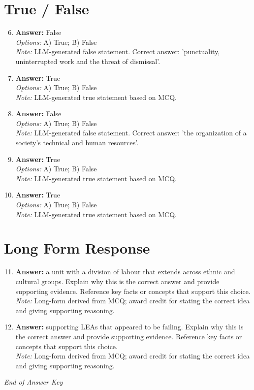 \documentclass[12pt]{article}
\begin{document}
\section*{True / False}
\begin{enumerate}[label=\arabic*.]
\setcounter{enumi}{5}
\item \textbf{Answer:} False
\\ \textit{Options:} A) True; B) False
\\ \textit{Note:} LLM-generated false statement. Correct answer: 'punctuality, uninterrupted work and the threat of dismissal'.
\item \textbf{Answer:} True
\\ \textit{Options:} A) True; B) False
\\ \textit{Note:} LLM-generated true statement based on MCQ.
\item \textbf{Answer:} False
\\ \textit{Options:} A) True; B) False
\\ \textit{Note:} LLM-generated false statement. Correct answer: 'the organization of a society's technical and human resources'.
\item \textbf{Answer:} True
\\ \textit{Options:} A) True; B) False
\\ \textit{Note:} LLM-generated true statement based on MCQ.
\item \textbf{Answer:} True
\\ \textit{Options:} A) True; B) False
\\ \textit{Note:} LLM-generated true statement based on MCQ.
\end{enumerate}

\section*{Long Form Response}
\begin{enumerate}[label=\arabic*.]
\setcounter{enumi}{10}
\item \textbf{Answer:} a unit with a division of labour that extends across ethnic and cultural groups. Explain why this is the correct answer and provide supporting evidence. Reference key facts or concepts that support this choice.
\\ \textit{Note:} Long-form derived from MCQ; award credit for stating the correct idea and giving supporting reasoning.
\item \textbf{Answer:} supporting LEAs that appeared to be failing. Explain why this is the correct answer and provide supporting evidence. Reference key facts or concepts that support this choice.
\\ \textit{Note:} Long-form derived from MCQ; award credit for stating the correct idea and giving supporting reasoning.
\end{enumerate}

\vfill
\noindent\textit{End of Answer Key}
\end{document}

